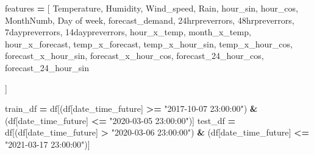\documentclass[mstat,12pt]{unswthesis}
\newenvironment{Shaded}{\begin{snugshade}}{\end{snugshade}}
\newcommand{\NormalTok}[1]{#1}
\newcommand{\OperatorTok}[1]{\textcolor[rgb]{0.81,0.36,0.00}{\textbf{#1}}}
\newcommand{\StringTok}[1]{\textcolor[rgb]{0.31,0.60,0.02}{#1}}
\begin{document}
\begin{Shaded}
\begin{Highlighting}[]
\NormalTok{features }\OperatorTok{=}\NormalTok{ [}
    \StringTok{\textquotesingle{}Temperature\textquotesingle{}}\NormalTok{, }\StringTok{\textquotesingle{}Humidity\textquotesingle{}}\NormalTok{,}
    \StringTok{\textquotesingle{}Wind\_speed\textquotesingle{}}\NormalTok{, }\StringTok{\textquotesingle{}Rain\textquotesingle{}}\NormalTok{,}
    \StringTok{\textquotesingle{}hour\_sin\textquotesingle{}}\NormalTok{, }\StringTok{\textquotesingle{}hour\_cos\textquotesingle{}}\NormalTok{,}
    \StringTok{\textquotesingle{}MonthNumb\textquotesingle{}}\NormalTok{, }\StringTok{\textquotesingle{}Day of week\textquotesingle{}}\NormalTok{,}
    \StringTok{\textquotesingle{}forecast\_demand\textquotesingle{}}\NormalTok{,}
    \StringTok{\textquotesingle{}24hrpreverrors\textquotesingle{}}\NormalTok{,}
    \StringTok{\textquotesingle{}48hrpreverrors\textquotesingle{}}\NormalTok{, }\StringTok{\textquotesingle{}7daypreverrors\textquotesingle{}}\NormalTok{, }\StringTok{\textquotesingle{}14daypreverrors\textquotesingle{}}\NormalTok{,}
    \StringTok{\textquotesingle{}hour\_x\_temp\textquotesingle{}}\NormalTok{, }\StringTok{\textquotesingle{}month\_x\_temp\textquotesingle{}}\NormalTok{, }\StringTok{\textquotesingle{}hour\_x\_forecast\textquotesingle{}}\NormalTok{, }\StringTok{\textquotesingle{}temp\_x\_forecast\textquotesingle{}}\NormalTok{,}
    \StringTok{\textquotesingle{}temp\_x\_hour\_sin\textquotesingle{}}\NormalTok{, }\StringTok{\textquotesingle{}temp\_x\_hour\_cos\textquotesingle{}}\NormalTok{,}
    \StringTok{\textquotesingle{}forecast\_x\_hour\_sin\textquotesingle{}}\NormalTok{, }\StringTok{\textquotesingle{}forecast\_x\_hour\_cos\textquotesingle{}}\NormalTok{,}
    \StringTok{\textquotesingle{}forecast\_24\_hour\_cos\textquotesingle{}}\NormalTok{, }\StringTok{\textquotesingle{}forecast\_24\_hour\_sin\textquotesingle{}}

\NormalTok{]}

\NormalTok{train\_df }\OperatorTok{=}\NormalTok{ df[(df[}\StringTok{\textquotesingle{}date\_time\_future\textquotesingle{}}\NormalTok{] }\OperatorTok{\textgreater{}=} \StringTok{"2017{-}10{-}07 23:00:00"}\NormalTok{) }\OperatorTok{\&} 
\NormalTok{    (df[}\StringTok{\textquotesingle{}date\_time\_future\textquotesingle{}}\NormalTok{] }\OperatorTok{\textless{}=} \StringTok{"2020{-}03{-}05 23:00:00"}\NormalTok{)]}
\NormalTok{test\_df }\OperatorTok{=}\NormalTok{ df[(df[}\StringTok{\textquotesingle{}date\_time\_future\textquotesingle{}}\NormalTok{] }\OperatorTok{\textgreater{}} \StringTok{"2020{-}03{-}06 23:00:00"}\NormalTok{) }\OperatorTok{\&} 
\NormalTok{    (df[}\StringTok{\textquotesingle{}date\_time\_future\textquotesingle{}}\NormalTok{] }\OperatorTok{\textless{}=} \StringTok{"2021{-}03{-}17 23:00:00"}\NormalTok{)]}


\end{Highlighting}
\end{Shaded}
\end{document}
